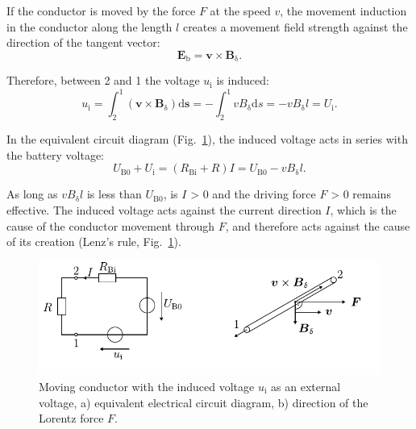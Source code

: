 \begin{solutionblock}
    If the conductor is moved by the force $F$ at the speed $v$, the movement induction in the conductor along the length $l$ creates a movement field strength against the direction of the tangent vector:
    \begin{equation}
        \boldsymbol{E}_{\mathrm{b}} = \boldsymbol{v} \times \boldsymbol{B}_{\mathrm{\updelta}}.
    \end{equation}
    
    Therefore, between 2 and 1 the voltage $u_{\mathrm{i}}$ is induced:
    \begin{equation}
        u_{\mathrm{i}}
        = \int_{2}^{1} (\boldsymbol{v} \times \boldsymbol{B}_{\updelta}) \mathrm{d}\boldsymbol{s}
        = - \int_{2}^{1} v B_{\updelta} \mathrm{d}s
        = -v B_{\updelta} l
        = U_{\mathrm{i}}.
    \end{equation}

    In the equivalent circuit diagram (Fig.~\ref{fig:solution_movingConductor}), the induced voltage acts in series with the battery voltage:
    \begin{equation}
        U_{\mathrm{B0}} + U_{\mathrm{i}} = (R_{\mathrm{Bi}} + R) I
        = U_{\mathrm{B0}} - v B_{\updelta} l.
    \end{equation}

    As long as $v B_{\updelta} l$ is less than $U_{\mathrm{B0}}$, is $I$ > 0 and the driving force $F$ > 0 remains effective. The induced voltage acts against the current direction $I$, which is the cause of the conductor movement through $F$, and therefore acts against the cause of its creation (Lenz's rule, Fig.~\ref{fig:solution_movingConductor}).

    \begin{figure}[ht]
        \centering
        \includegraphics{fig/ex01/solution_movingConductor.pdf}
        \caption{Moving conductor with the induced voltage $u_{\mathrm{i}}$ as an external voltage, a) equivalent electrical circuit diagram, b) direction of the Lorentz force $F$.}
        \label{fig:solution_movingConductor}
    \end{figure}

\end{solutionblock}




